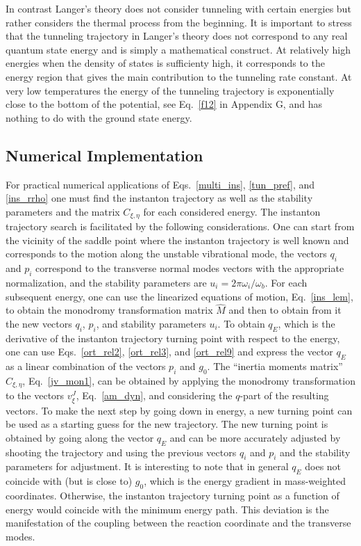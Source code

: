 \documentclass[journal=jpcafh,manuscript=article]{achemso}
\begin{document}
In contrast Langer's theory does not consider tunneling with certain
energies but rather considers the thermal process from the
beginning. It is important to stress that the tunneling trajectory in
Langer's theory does not correspond to any real quantum state energy
and is simply a mathematical construct.  At relatively high energies
when the density of states is sufficienty high, it corresponds to the
energy region that gives the main contribution to the tunneling rate
constant. At very low temperatures the energy of the tunneling
trajectory is exponentially close to the bottom of the potential, see
Eq.~\ref{f12} in Appendix G, and has nothing to do with the ground
state energy.

\subsection{Numerical Implementation}

For practical numerical applications of Eqs.~\ref{multi_ins}, \ref{tun_pref},
and \ref{ins_rrho} one must find the instanton trajectory as well as
the stability parameters and the matrix $C_{\xi,\eta}$ for each
considered energy.\cite{liberto16,mcconnell17a,winter19} The instanton
trajectory search is facilitated by the following considerations.  One
can start from the vicinity of the saddle point where the instanton
trajectory is well known and corresponds to the motion along the
unstable vibrational mode, the vectors $q_i$ and $p_i$ correspond to
the transverse normal modes vectors with the appropriate
normalization, and the stability parameters are
$u_i=2\pi\omega_i/\omega_b$.  For each subsequent energy, one can use
the linearized equations of motion, Eq.~\ref{ins_lem}, to obtain the
monodromy transformation matrix $\hat{M}$ and then to obtain from it
the new vectors $q_i$, $p_i$, and stability parameters $u_i$.  To
obtain $q_E$, which is the derivative of the instanton trajectory
turning point with respect to the energy, one can use Eqs.~\ref{ort_rel2},
\ref{ort_rel3}, and \ref{ort_rel9} and express the vector $q_E$ as a
linear combination of the vectors $p_i$ and $g_0$.  The ``inertia
moments matrix'' $C_{\xi,\eta}$, Eq.~\ref{jv_mon1}, can be obtained by
applying the monodromy transformation to the vectors $v^J_\xi$,
Eq.~\ref{am_dyn}, and considering the $q$-part of the resulting
vectors.  To make the next step by going down in energy, a new turning
point can be used as a starting guess for the new trajectory. The new
turning point is obtained by going along the vector $q_E$ and can be
more accurately adjusted by shooting the trajectory and using the
previous vectors $q_i$ and $p_i$ and the stability parameters for
adjustment.  It is interesting to note that in general $q_E$ does not
coincide with (but is close to) $g_0$, which is the energy gradient in
mass-weighted coordinates. Otherwise, the instanton trajectory turning
point as a function of energy would coincide with the minimum energy
path. This deviation is the manifestation of the coupling between the
reaction coordinate and the transverse modes.
\end{document}
